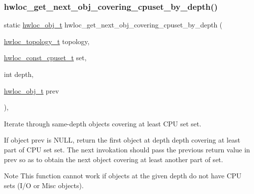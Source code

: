 \subsubsection{\texorpdfstring{hwloc\+\_\+get\+\_\+next\+\_\+obj\+\_\+covering\+\_\+cpuset\+\_\+by\+\_\+depth()}{hwloc\_get\_next\_obj\_covering\_cpuset\_by\_depth()}}
{\footnotesize\ttfamily static \hyperlink{a00185_ga79b8ab56877ef99ac59b833203391c7d}{hwloc\+\_\+obj\+\_\+t} hwloc\+\_\+get\+\_\+next\+\_\+obj\+\_\+covering\+\_\+cpuset\+\_\+by\+\_\+depth (\begin{DoxyParamCaption}\item[{\hyperlink{a00186_ga9d1e76ee15a7dee158b786c30b6a6e38}{hwloc\+\_\+topology\+\_\+t}}]{topology,  }\item[{\hyperlink{a00183_ga1f784433e9b606261f62d1134f6a3b25}{hwloc\+\_\+const\+\_\+cpuset\+\_\+t}}]{set,  }\item[{int}]{depth,  }\item[{\hyperlink{a00185_ga79b8ab56877ef99ac59b833203391c7d}{hwloc\+\_\+obj\+\_\+t}}]{prev }\end{DoxyParamCaption})\hspace{0.3cm}{\ttfamily [inline]}, {\ttfamily [static]}}



Iterate through same-\/depth objects covering at least C\+PU set {\ttfamily set}. 

If object {\ttfamily prev} is {\ttfamily N\+U\+LL}, return the first object at depth {\ttfamily depth} covering at least part of C\+PU set {\ttfamily set}. The next invokation should pass the previous return value in {\ttfamily prev} so as to obtain the next object covering at least another part of {\ttfamily set}.

\begin{DoxyNote}{Note}
This function cannot work if objects at the given depth do not have C\+PU sets (I/O or Misc objects). 
\end{DoxyNote}
\mbox{\label{a00196_ga91cfae08b092e7966002e15d1e987213}} 
